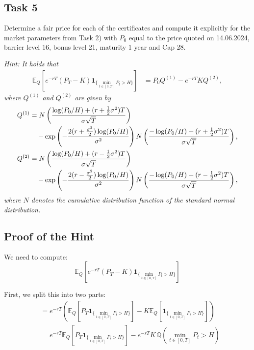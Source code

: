 \documentclass{article}
\begin{document}
\subsection*{Task 5}
Determine a fair price for each of the certificates and compute it explicitly for the market parameters from Task 2) with $P_0$ equal to the price quoted on 14.06.2024, barrier level 16, bonus level 21, maturity 1 year and Cap 28.

\textit{Hint: It holds that}
\begin{align}
\mathbb{E}_Q\left[e^{-rT}(P_T - K)\mathbf{1}_{\{\min_{t \in [0,T]} P_t > H\}}\right] &= P_0 Q^{(1)} - e^{-rT}K Q^{(2)},
\end{align}
\textit{where $Q^{(1)}$ and $Q^{(2)}$ are given by}
\begin{align}
Q^{(1)} &= N\left(\frac{\log(P_0/H) + (r + \frac{1}{2}\sigma^2)T}{\sigma\sqrt{T}}\right) \notag\\
&\quad - \exp\left(-\frac{2(r + \frac{\sigma^2}{2})\log(P_0/H)}{\sigma^2}\right) N\left(\frac{-\log(P_0/H) + (r + \frac{1}{2}\sigma^2)T}{\sigma\sqrt{T}}\right),\\
Q^{(2)} &= N\left(\frac{\log(P_0/H) + (r - \frac{1}{2}\sigma^2)T}{\sigma\sqrt{T}}\right) \notag\\
&\quad - \exp\left(-\frac{2(r - \frac{\sigma^2}{2})\log(P_0/H)}{\sigma^2}\right) N\left(\frac{-\log(P_0/H) + (r - \frac{1}{2}\sigma^2)T}{\sigma\sqrt{T}}\right),
\end{align}
\textit{where $N$ denotes the cumulative distribution function of the standard normal distribution.}

\subsection*{Proof of the Hint}

We need to compute:
\begin{equation}
\mathbb{E}_Q\left[e^{-rT}(P_T - K)\mathbf{1}_{\{\min_{t \in [0,T]} P_t > H\}}\right]
\end{equation}

First, we split this into two parts:
\begin{align}
&= e^{-rT}\left(\mathbb{E}_Q\left[P_T \mathbf{1}_{\{\min_{t \in [0,T]} P_t > H\}}\right] - K\mathbb{E}_Q\left[\mathbf{1}_{\{\min_{t \in [0,T]} P_t > H\}}\right]\right)\\
&= e^{-rT}\mathbb{E}_Q\left[P_T \mathbf{1}_{\{\min_{t \in [0,T]} P_t > H\}}\right] - e^{-rT}K\,\mathbb{Q}\left(\min_{t \in [0,T]} P_t > H\right)
\end{align}
\end{document}
